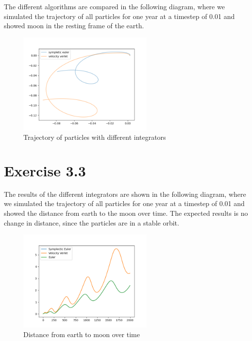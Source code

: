 \documentclass[a4paper,11pt,bibtotoc]{scrartcl}
\begin{document}
The different algorithms are compared in the following diagram, where we simulated the trajectory of all particles for one year at a timestep of 0.01 and showed moon in the resting frame of the earth.
\begin{figure}[!htbp]
	\centering
	\includegraphics[width=0.6\textwidth]{ex_3_2_1.png}
	\caption{Trajectory of particles with different integrators}
	\label{fig:ex_3_2_1}
\end{figure}

\section{Exercise 3.3}

The results of the different integrators are shown in the following diagram, where we simulated the trajectory of all particles for one year at a timestep of 0.01 and showed the distance from earth to the moon over time.
The expected results is no change in distance, since the particles are in a stable orbit.

\begin{figure}[!htbp]
	\centering
	\includegraphics[width=0.6\textwidth]{ex_3_3_1.png}
	\caption{Distance from earth to moon over time}
	\label{fig:ex_3_3_1}
\end{figure}
\end{document}
